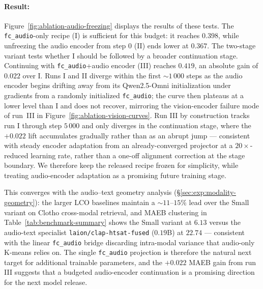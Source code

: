 \paragraph{Result:}
Figure~\ref{fig:ablation-audio-freezing} displays the results of these tests.
The \texttt{fc\_audio}-only recipe (I) is sufficient for this budget: it reaches $0.398$, while unfreezing the audio encoder from step $0$ (II) ends lower at $0.367$.
The two-stage variant tests whether I should be followed by a broader continuation stage.
Continuing with \texttt{fc\_audio}+audio encoder (III) reaches $0.419$, an absolute gain of $0.022$ over I.
Runs I and II diverge within the first $\sim$$1\,000$ steps as the audio encoder begins drifting away from its Qwen2.5-Omni initialization under gradients from a randomly initialized \texttt{fc\_audio}; the curve then plateaus at a lower level than I and does not recover, mirroring the vision-encoder failure mode of run~III in Figure~\ref{fig:ablation-vision-curves}.
Run III by construction tracks run I through step $5\,000$ and only diverges in the continuation stage, where the $+0.022$ lift accumulates gradually rather than as an abrupt jump --- consistent with steady encoder adaptation from an already-converged projector at a $20\times$-reduced learning rate, rather than a one-off alignment correction at the stage boundary.
We therefore keep the released recipe frozen for simplicity, while treating audio-encoder adaptation as a promising future training stage.

This converges with the audio--text geometry analysis (\S\ref{sec:exp:modality-geometry}): the larger LCO baselines maintain a $\sim$$11$--$15\%$ lead over the Small variant on Clotho cross-modal retrieval, and MAEB clustering in Table~\ref{tab:benchmark-summary} shows the Small variant at $6.13$ versus the audio-text specialist \texttt{laion/clap-htsat-fused} ($0.19$B) at $22.74$ --- consistent with the linear \texttt{fc\_audio} bridge discarding intra-modal variance that audio-only K-means relies on.
The single \texttt{fc\_audio} projection is therefore the natural next target for additional trainable parameters, and the $+0.022$ MAEB gain from run III suggests that a budgeted audio-encoder continuation is a promising direction for the next model release.


